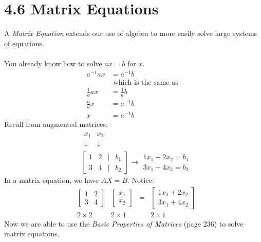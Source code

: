 \documentclass[14pt]{extarticle}
\begin{document}
\section*{4.6 Matrix Equations}
A \textit{Matrix Equation} extends our use of algebra to more easily solve large systems of equations.
\\\\
You already know how to solve $ax=b$ for $x$.
\begin{align*}
	a^{-1}ax &= a^{-1}b \\
	&\text{ which is the same as }\\
	\frac{1}{a}ax &= \frac{1}{a}b \\
	\frac{a}{a}x &= a^{-1}b \\
	x &= a^{-1}b
\end{align*}
Recall from augmented matrices:
\begin{align*}
	&\begin{array}{cc}
		x_1 & x_2 \\
		\downarrow & \downarrow
	\end{array} \\
	&\begin{bmatrix}
		1 & 2 & | & b_1 \\
		3 & 4 & | & b_2
	\end{bmatrix} \to
	\begin{array}{c}
		1x_1+2x_2 = b_1 \\
		3x_1 + 4x_2 = b_2
	\end{array}
\end{align*}
In a matrix equation, we have $AX=B$. Notice:
\begin{align*}
	&\begin{bmatrix}
		1 & 2 \\
		3 & 4
	\end{bmatrix}
	&\begin{bmatrix}
		x_1 \\
		x_2
	\end{bmatrix}
	&=
	&\begin{bmatrix}
		1x_1+2x_2 \\
		3x_1 + 4x_2
	\end{bmatrix} \\
	&2\times 2 &2\times 1 & &2\times 1
\end{align*}
Now we are able to use the \textit{Basic Properties of Matrices} (page 236) to solve matrix equations.\\
\end{document}
